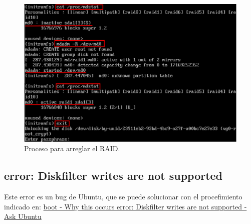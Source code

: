 \begin{figure}[H]
    \begin{center}
        \includegraphics[scale=0.5]{Imagenes/activar.eps}
        \caption{Proceso para arreglar el RAID.}
        \label{fig11}
    \end{center}
\end{figure}


\label{praid}
\subsection{error:  Diskfilter writes are not supported}
Este error es un bug de Ubuntu, que se puede solucionar con el procefimiento indicado en: \href{http://askubuntu.com/questions/468466/why-this-occurs-error-diskfilter-writes-are-not-supported/468487#468487}{boot - Why this occurs error: Diskfilter writes are not supported - Ask Ubuntu}
